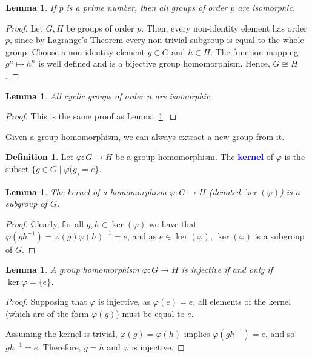 \documentclass[12pt]{report}
\newcommand{\indx}[1]{\index{#1}\textbf{\textcolor{blue}{#1}}}
\newcommand{\iso}{\cong}
\renewcommand{\phi}{\varphi}
\newtheorem{lemma}[theorem]{Lemma}
\theoremstyle{definition}
\newtheorem{definition}[theorem]{Definition}
\begin{document}
\begin{lemma}
  \label{lem:group-theory:groups-of-order-p-are-isomorphic}
  If \(p\) is a prime number, then all groups of order \(p\) are isomorphic.
\end{lemma}

\begin{proof}
  Let \(G, H\) be groups of order \(p\).
  Then, every non-identity element has order \(p\), since by Lagrange's Theorem every non-trivial subgroup is equal to the whole group.
  Choose a non-identity element \(g \in G\) and \(h \in H\).
  The function mapping \(g^{n} \mapsto h^{n}\) is well defined and is a bijective group homomorphism.
  Hence, \(G \iso H\).
\end{proof}

\begin{lemma}
  All cyclic groups of order \(n\) are isomorphic.
\end{lemma}

\begin{proof}
  This is the same proof as Lemma~\ref{lem:group-theory:groups-of-order-p-are-isomorphic}.
\end{proof}


Given a group homomorphism, we can always extract a new group from it.

\begin{definition}
  Let \(\phi:G \to H\) be a group homomorphism.
  The \indx{kernel} of \(\phi\) is the subset \(\{g \in G \mid \phi(g_) = e\}\).
\end{definition}

\begin{lemma}
\label{lem:group-theory:kernels-are-subgroups}
  The kernel of a homomorphism \(\phi : G \to H\) (denoted \(\ker(\phi)\)) is a subgroup of \(G\).
\end{lemma}

\begin{proof}
 Clearly, for all \(g, h \in \ker(\phi)\) we have that \(\phi(gh^{-1}) = \phi(g)\phi(h)^{-1} = e\), and as \(e \in \ker(\phi)\), \(\ker (\phi)\) is a subgroup of \(G\).
\end{proof}


\begin{lemma}
  A group homomorphism \(\phi : G \to H\) is injective if and only if \(\ker{\phi} = \{e\}\).
\end{lemma}

\begin{proof}
  Supposing that \(\phi\) is injective, as \(\phi(e) = e\), all elements of the kernel (which are of the form \(\phi(g)\)) must be equal to \(e\).

  Assuming the kernel is trivial, \(\phi(g) = \phi(h)\) implies \(\phi(gh^{-1}) = e\), and so \(gh^{-1} = e\).
  Therefore, \(g = h\) and \(\phi\) is injective.
\end{proof}
\end{document}
